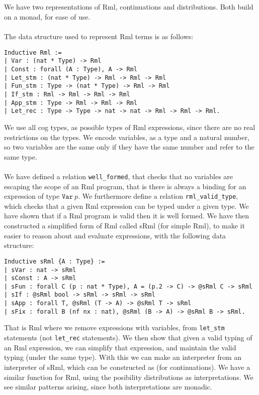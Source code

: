 \documentclass[11pt, leqno]{article}
\newcommand{\wellformed}{\texttt{well\_formed}}
\newcommand{\valid}{\texttt{rml\_valid\_type}}
\theoremstyle{definition}
\begin{document}
\subsection{\rml}
We have two representations of Rml, continuations and distributions. Both build on a monad, for ease of use.
\\ \\
The data structure used to represent Rml terms is as follows:
\begin{center}
  \begin{minipage}{0.7\linewidth}
    \begin{lstlisting}[language=coq]
Inductive Rml :=
| Var : (nat * Type) -> Rml
| Const : forall (A : Type), A -> Rml
| Let_stm : (nat * Type) -> Rml -> Rml -> Rml
| Fun_stm : Type -> (nat * Type) -> Rml -> Rml
| If_stm : Rml -> Rml -> Rml -> Rml
| App_stm : Type -> Rml -> Rml -> Rml
| Let_rec : Type -> Type -> nat -> nat -> Rml -> Rml -> Rml.
    \end{lstlisting}
  \end{minipage}
\end{center}
We use all cog types, as possible types of Rml expressions, since there are no real restrictions on the types. We encode variables, as a type and a natural number, so two variables are the same only if they have the same number and refer to the same type.
\\ \\
We have defined a relation \wellformed, that checks that no variables are escaping the scope of an Rml program, that is there is always a binding for an expression of type \(\mathtt{Var}~p\). We furthermore define a relation \valid, which checks that a given Rml expression can be typed under a given type. We have shown that if a Rml program is valid then it is well formed. We have then constructed a simplified form of Rml called sRml (for simple Rml), to make it easier to reason about and evaluate expressions, with the following data structure:
\begin{center}
  \begin{minipage}{0.7\linewidth}
    \begin{lstlisting}[language=coq]
Inductive sRml {A : Type} :=
| sVar : nat -> sRml
| sConst : A -> sRml
| sFun : forall C (p : nat * Type), A = (p.2 -> C) -> @sRml C -> sRml
| sIf : @sRml bool -> sRml -> sRml -> sRml
| sApp : forall T, @sRml (T -> A) -> @sRml T -> sRml
| sFix : forall B (nf nx : nat), @sRml (B -> A) -> @sRml B -> sRml.
    \end{lstlisting}
  \end{minipage}
\end{center}
That is Rml where we remove expressions with variables, from \texttt{let\_stm} statements (not \texttt{let\_rec} statements). We then show that given a valid typing of an Rml expression, we can simplify that expression, and maintain the valid typing (under the same type). With this we can make an interpreter from an interpreter of sRml, which can be constructed as (for continuations). We have a similar function for Rml, using the posibility distributions as interpretations. We see similar patterns arising, since both interpretations are monadic.
\end{document}
